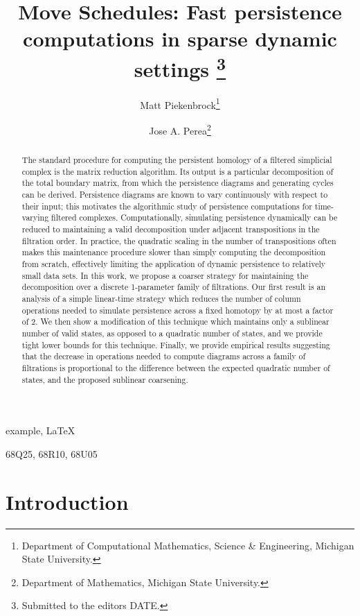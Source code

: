 \documentclass{siamart190516}
\title{Move Schedules: Fast persistence computations in sparse dynamic settings
	\thanks{Submitted to the editors DATE.
		\funding{This work was partially supported by the National Science Foundation through grants CCF-2006661 and CAREER award DMS-1943758.}
	}
}
\author{
	Matt Piekenbrock\thanks{Department of Computational Mathematics, Science \& Engineering, Michigan State University.}
	\and Jose A. Perea\thanks{Department of Mathematics, Michigan State University.}
}
\begin{document}
 

\maketitle

\begin{abstract}
	The standard procedure for computing the persistent homology of a filtered simplicial complex is the matrix reduction algorithm. Its output is a particular decomposition of the total boundary matrix, from which the persistence diagrams and generating cycles can be derived. 
	Persistence diagrams are known to vary continuously with respect to their input; this motivates the algorithmic study of persistence computations for time-varying filtered complexes. Computationally, simulating persistence dynamically can be reduced to maintaining a valid decomposition under adjacent transpositions in the filtration order. In practice, the quadratic scaling in the number of  transpositions often makes this maintenance procedure slower than simply computing the decomposition from scratch, effectively limiting the application of dynamic persistence to relatively small data sets. In this work, we propose a coarser strategy for maintaining the decomposition over a discrete 1-parameter family of filtrations. Our first result is an analysis of a simple linear-time strategy which reduces the number of column operations needed to simulate persistence across a fixed homotopy by at most a factor of 2. We then show a modification of this technique which maintains only a sublinear number of valid states, as opposed to a quadratic number of states, and we provide tight lower bounds for this technique.
	Finally, we provide empirical results suggesting that the decrease in operations needed to compute diagrams across a family of filtrations is proportional to the difference between the expected quadratic number of states, and the proposed sublinear coarsening.
\end{abstract}


\begin{keywords}
  example, \LaTeX
\end{keywords}

\begin{AMS}
  68Q25, 68R10, 68U05
\end{AMS}

\section{Introduction} 
\end{document}
